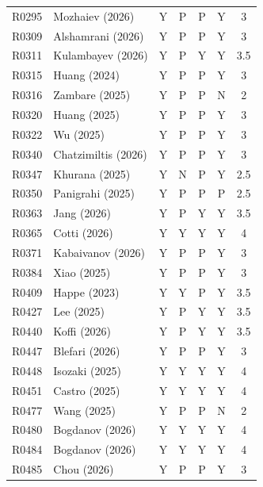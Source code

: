 \begin{longtable}{@{}lp{}ccccc@{}}
R0295 & Mozhaiev (2026) \cite{R0295_Mozhaiev_2026} & Y & P & P & Y & 3 \\
R0309 & Alshamrani (2026) \cite{R0309_Alshamrani_2026} & Y & P & P & Y & 3 \\
R0311 & Kulambayev (2026) \cite{R0311_Kulambayev_2026} & Y & P & Y & Y & 3.5 \\
R0315 & Huang (2024) \cite{R0315_Huang_2024} & Y & P & P & Y & 3 \\
R0316 & Zambare (2025) \cite{R0316_Zambare_2025} & Y & P & P & N & 2 \\
R0320 & Huang (2025) \cite{R0320_Huang_2025} & Y & P & P & Y & 3 \\
R0322 & Wu (2025) \cite{R0322_Wu_2025} & Y & P & P & Y & 3 \\
R0340 & Chatzimiltis (2026) \cite{R0340_Chatzimiltis_2026} & Y & P & P & Y & 3 \\
R0347 & Khurana (2025) \cite{R0347_Khurana_2025} & Y & N & P & Y & 2.5 \\
R0350 & Panigrahi (2025) \cite{R0350_Panigrahi_2025} & Y & P & P & P & 2.5 \\
R0363 & Jang (2026) \cite{R0363_Jang_2026} & Y & P & Y & Y & 3.5 \\
R0365 & Cotti (2026) \cite{R0365_Cotti_2026} & Y & Y & Y & Y & 4 \\
R0371 & Kabaivanov (2026) \cite{R0371_Kabaivanov_2026} & Y & P & P & Y & 3 \\
R0384 & Xiao (2025) \cite{R0384_Xiao_2025} & Y & P & P & Y & 3 \\
R0409 & Happe (2023) \cite{R0409_Happe_2023} & Y & Y & P & Y & 3.5 \\
R0427 & Lee (2025) \cite{R0427_Lee_2025} & Y & P & Y & Y & 3.5 \\
R0440 & Koffi (2026) \cite{R0440_Koffi_2026} & Y & P & Y & Y & 3.5 \\
R0447 & Blefari (2026) \cite{R0447_Blefari_2026} & Y & P & P & Y & 3 \\
R0448 & Isozaki (2025) \cite{R0448_Isozaki_2025} & Y & Y & Y & Y & 4 \\
R0451 & Castro (2025) \cite{R0451_Castro_2025} & Y & Y & Y & Y & 4 \\
R0477 & Wang (2025) \cite{R0477_Wang_2025} & Y & P & P & N & 2 \\
R0480 & Bogdanov (2026) \cite{R0480_Bogdanov_2026} & Y & Y & Y & Y & 4 \\
R0484 & Bogdanov (2026) \cite{R0484_Bogdanov_2026} & Y & Y & Y & Y & 4 \\
R0485 & Chou (2026) \cite{R0485_Chou_2026} & Y & P & P & Y & 3 \\

\end{longtable}
